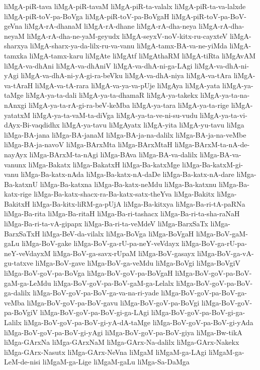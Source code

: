 {liMgA-piR-tava
liMgA-piR-tavaM
liMgA-piR-ta-valalx
liMgA-piR-ta-va-lalxde
liMgA-piR-toV-pa-BoVga
liMgA-piR-toV-pa-BoVgaH
liMgA-piR-toV-pa-BoV-geVna
liMgA-rA-dhanaM
liMgA-rA-dhane
liMgA-rA-dha-neya
liMgA-rA-dha-neyaM
liMgA-rA-dha-ne-yaM-geyudx
liMgA-seyxV-noV-kitx-ru-cayxteV
liMgA-sharxya
liMgA-sharx-ya-da-lilx-ru-va-vanu
liMgA-tamx-BA-va-ne-yiMda
liMgA-tamxka
liMgA-tamx-karu
liMgAte
liMgAtf
liMgAthaRM
liMgA-tiRta
liMgAvAM
liMgA-va-dhAni
liMgA-va-dhAniV
liMgA-va-dhA-ni-ga-LAgi
liMgA-va-dhA-ni-yAgi
liMgA-va-dhA-ni-yA-gi-ra-beVku
liMgA-va-dhA-niya
liMgA-va-tAra
liMgA-va-tAraH
liMgA-va-tA-rara
liMgA-va-ya-va-pUje
liMgAya
liMgA-yata
liMgA-ya-taMge
liMgA-ya-ta-dali
liMgA-ya-ta-dhamaR
liMgA-ya-takekx
liMgA-ya-ta-na-nAnxgi
liMgA-ya-ta-rA-gi-ra-beV-keMba
liMgA-ya-tara
liMgA-ya-ta-rige
liMgA-yatatxM
liMgA-ya-ta-vaM-ta-diVga
liMgA-ya-ta-ve-ni-su-vudu
liMgA-ya-ta-vi-dAyx-Bi-vaqdidhx
liMgA-ya-tavu
liMgAyatx
liMgA-yita
liMgA-yu-tavu
liMga
liMga-BA-jana
liMga-BA-janaM
liMga-BA-ja-na-dalilx
liMga-BA-ja-na-veMbe
liMga-BA-ja-navoV
liMga-BArxMta
liMga-BArxMtaH
liMga-BArxM-ta-nA-de-nayAyx
liMga-BArxM-ta-nAgi
liMga-BAva
liMga-BA-va-dalilx
liMga-BA-va-vanunx
liMga-Bakatx
liMga-BakatxH
liMga-Ba-katxMge
liMga-Ba-katxM-gi-vanu
liMga-Ba-katx-nAda
liMga-Ba-katx-nA-daDe
liMga-Ba-katx-nA-dare
liMga-Ba-katxnU
liMga-Ba-katxna
liMga-Ba-katx-neMdu
liMga-Ba-katxnu
liMga-Ba-katx-rige
liMga-Ba-katx-shacx-ra-Ba-katx-satx-theYva
liMga-Bakitx
liMga-BakitxH
liMga-Ba-kitx-liRM-ga-pUjA
liMga-Ba-kitxya
liMga-Ba-ri-tA-paRNa
liMga-Ba-rita
liMga-Ba-ritaH
liMga-Ba-ri-tashacx
liMga-Ba-ri-ta-sha-raNaH
liMga-Ba-ri-ta-vA-gipapx
liMga-Ba-ri-ta-veMdeV
liMga-BarxSaTx
liMga-BarxSaTxH
liMga-BeV-da-vilalx
liMga-BoVga
liMga-BoVgaH
liMga-BoV-gaM-gaLu
liMga-BoV-gake
liMga-BoV-ga-rU-pa-neY-veVdayx
liMga-BoV-ga-rU-pa-neY-veVdayxM
liMga-BoV-ga-savx-rUpaM
liMga-BoV-gasayx
liMga-BoV-ga-vA-gu-tatxve
liMga-BoV-gave
liMga-BoV-ga-veMdu
liMga-BoVgi
liMga-BoVgiV
liMga-BoV-goV-pa-BoVga
liMga-BoV-goV-pa-BoVgaH
liMga-BoV-goV-pa-BoV-gaM-ga-LeMdu
liMga-BoV-goV-pa-BoV-gaM-ga-Lelalx
liMga-BoV-goV-pa-BoV-ga-dalilx
liMga-BoV-goV-pa-BoV-ga-va-na-ri-yade
liMga-BoV-goV-pa-BoV-ga-veMba
liMga-BoV-goV-pa-BoV-gavu
liMga-BoV-goV-pa-BoVgi
liMga-BoV-goV-pa-BoVgiV
liMga-BoV-goV-pa-BoV-gi-ga-LAgi
liMga-BoV-goV-pa-BoV-gi-ga-Lalilx
liMga-BoV-goV-pa-BoV-gi-yA-dA-taMge
liMga-BoV-goV-pa-BoV-gi-yAda
liMga-BoV-goV-pa-BoV-gi-yAgi
liMga-BoV-goV-pa-BoV-giya
liMga-Bw-tikA
liMga-GArxNa
liMga-GArxNaM
liMga-GArx-Na-dalilx
liMga-GArx-Nakekx
liMga-GArx-Nasutx
liMga-GArx-NeVna
liMgaM
liMgaM-ga-LAgi
liMgaM-ga-LeM-de-nisi
liMgaM-ga-Lige
liMgaM-gaLu
liMga-Sa-DaMga
}
